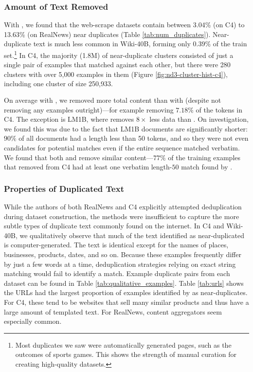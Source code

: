 \subsubsection{Amount of Text Removed}
With \Approx{}, we found that the web-scrape datasets contain between 3.04\% (on C4) to 13.63\% (on RealNews) near duplicates (Table \ref{tab:num_duplicates}).
Near-duplicate text is much less common in Wiki-40B, forming only 0.39\% of the train set.\footnote{Most duplicates we saw were automatically generated pages, such as the outcomes of sports games.
This shows the strength of manual curation for creating high-quality datasets.}
In C4, the majority (1.8M) of near-duplicate clusters consisted of just a single pair of examples that matched against each other, but there were 280 clusters with over 5,000 examples in them (Figure \ref{fig:nd3-cluster-hist-c4}), including one cluster of size 250,933.

On average with \Exact{}, we removed more total content than with \Approx{} (despite \Exact{} not removing any examples outright)---for example removing $7.18\%$ of the tokens in C4.
%
The exception is LM1B, where \Exact{} removes $8\times$ less data than
\Approx{}.
On investigation, we found this was due to the fact that LM1B documents are significantly shorter: $90\%$ of all documents had a length less than 50 tokens, and so they were not even candidates for potential matches even if the entire sequence matched verbatim.
%
We found that both \Approx{} and \Exact{} remove similar content---$77\%$ of the training examples that \Approx{} removed from C4 had at least one verbatim length-$50$ match found by \Exact{}.





\subsubsection{Properties of Duplicated Text}
While the authors of both RealNews and C4 explicitly attempted deduplication during dataset construction, the methods were insufficient to capture the more subtle types of duplicate text commonly found on the internet.
In C4 and Wiki-40B, we qualitatively observe that much of the text identified as near-duplicated is computer-generated.
The text is identical except for the names of places, businesses, products, dates, and so on. 
Because these examples frequently differ by just a few words at a time, deduplication strategies relying on exact string matching would fail to identify a match.
Example duplicate pairs from each dataset can be found in Table \ref{tab:qualitative_examples}.
Table \ref{tab:urls} shows the URLs had the largest proportion of examples identified by \Approx{} as near-duplicates. 
For C4, these tend to be websites that sell many similar products and thus have a large amount of templated text.
For RealNews, content aggregators seem especially common.

